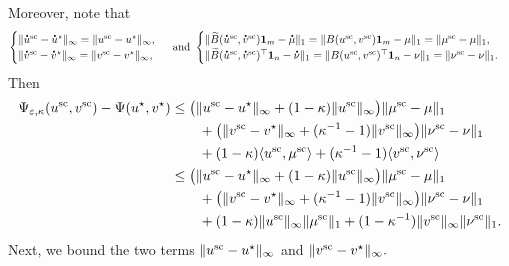 Moreover, note that 
\begin{align*}
\begin{cases}
\norm{\dt{u}^{\text{sc}} - \dt{u}^\star}_\infty = \norm{{u}^{\text{sc}} - {u}^\star}_\infty,\\
\norm{\dt{v}^{\text{sc}} - \dt{v}^\star}_\infty = \norm{{v}^{\text{sc}} - {v}^\star}_\infty,
\end{cases}
\text{ and }
\begin{cases}
\norm{\widetilde{B}(\dt{u}^{\text{sc}} ,\dt{v}^{\text{sc}})\mathbf 1_m - \dt{\mu}}_1 = \norm{{B}({u}^{\text{sc}} ,{v}^{\text{sc}})\mathbf 1_m - {\mu}}_1 = \norm{\mu^{\text{sc}} - \mu}_1,\\
\norm{\widetilde{B}(\dt{u}^{\text{sc}} ,\dt{v}^{\text{sc}})^\top\mathbf 1_n - \dt{\nu}}_1 = \norm{{B}({u}^{\text{sc}} ,{v}^{\text{sc}})^\top\mathbf 1_n - {\nu}}_1 = \norm{\nu^{\text{sc}} - \nu}_1.
\end{cases}
\end{align*}
Then
\begin{align}
\Psi_{\varepsilon, \kappa}(u^{\text{sc}} ,v^{\text{sc}}) -\Psi(u^\star, v^\star) &
\leq \big(\|{u}^{\text{sc}} - {u}^\star\|_\infty + (1- \kappa) \|{u}^{\text{sc}}\|_\infty\big)\|\mu^{\text{sc}} - \mu\|_1\nonumber\\
&\qquad + \big(\|{v}^{\text{sc}} - {v}^\star\|_\infty + (\kappa^{-1} - 1) \|{v}^{\text{sc}}\|_\infty\big) \|\nu^{\text{sc}} - \nu\|_1\nonumber\\
&\qquad + (1- \kappa)\langle {u}^{\text{sc}} ,{\mu}^{\text{sc}} \rangle + (\kappa^{-1} -1)\langle {v}^{\text{sc}} ,{\nu}^{\text{sc}} \rangle\nonumber\\
&\leq \big(\|{u}^{\text{sc}} - {u}^\star\|_\infty + (1- \kappa) \|{u}^{\text{sc}}\|_\infty\big)\|\mu^{\text{sc}} - \mu\|_1\nonumber\\
&\qquad + \big(\|{v}^{\text{sc}} - {v}^\star\|_\infty + (\kappa^{-1} - 1) \|{v}^{\text{sc}}\|_\infty\big) \|\nu^{\text{sc}} - \nu\|_1 \label{priori_bounds_induction}\\
&\qquad + (1- \kappa)\|{u}^{\text{sc}}\|_\infty\|{\mu}^{\text{sc}}\|_1 + (1- \kappa^{-1})\|{v}^{\text{sc}}\|_\infty\|{\nu}^{\text{sc}}\|_1.\nonumber
\end{align}
Next, we bound the two terms $\|{u}^{\textrm{sc}} - {u}^\star\|_\infty $ and $\|{v}^{\text{sc}} - {v}^\star\|_\infty.$
